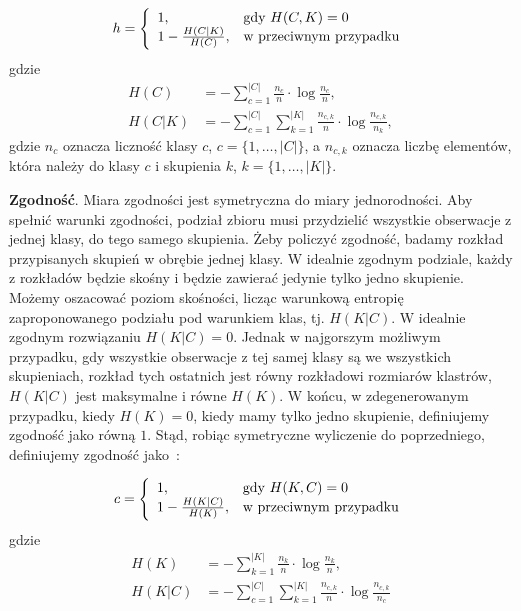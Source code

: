 \documentclass{praca1}
\begin{document}
\begin{equation}
h = \left\{
\begin{array}{l l}     
1, & \text{gdy } H(C,K) = 0\\
1 - \frac{H(C|K)}{H(C)}, & \text{w przeciwnym przypadku}
\end{array}\right.
\end{equation}
gdzie
\begin{align*}
H(C) & = - \sum\limits_{c = 1}^{|C|}\frac{n_c}{n}\cdot \log{\frac{n_c}{n}},  \\
H(C|K) & = - \sum\limits_{c = 1}^{|C|}\sum\limits_{k = 1}^{|K|}\frac{n_{c,k}}{n}\cdot \log{\frac{n_{c,k}}{n_k}},
\end{align*}
gdzie $n_c$ oznacza liczność klasy $c$, $c = \{1,\ldots, |C|\}$, a $n_{c,k}$ oznacza liczbę elementów, która należy do klasy $c$ i skupienia $k$, $k = \{1,\ldots, |K|\}$.

\textbf{Zgodność}. Miara zgodności jest symetryczna do miary jednorodności. Aby spełnić warunki zgodności, podział zbioru musi przydzielić wszystkie obserwacje z jednej klasy, do tego samego skupienia. Żeby policzyć zgodność, badamy rozkład przypisanych skupień w obrębie jednej klasy. W idealnie zgodnym podziale, każdy z rozkładów będzie skośny i będzie zawierać jedynie tylko jedno skupienie. Możemy oszacować poziom skośności, licząc warunkową entropię zaproponowanego podziału pod warunkiem klas, tj. $H(K|C)$. W idealnie zgodnym rozwiązaniu $H(K|C) = 0$. Jednak w najgorszym możliwym przypadku, gdy wszystkie obserwacje z tej samej klasy są we wszystkich skupieniach, rozkład tych ostatnich jest równy rozkładowi rozmiarów klastrów, $H(K|C)$ jest maksymalne i równe $H(K)$. W końcu, w zdegenerowanym przypadku, kiedy $H(K) = 0$, kiedy mamy tylko jedno skupienie, definiujemy zgodność jako równą $1$. Stąd, robiąc symetryczne wyliczenie do poprzedniego, definiujemy zgodność jako~\cite{Rosenberg2007:vmeasure}:

\begin{equation}
c = \left\{
\begin{array}{l l}     
1, & \text{gdy } H(K,C) = 0\\
1 - \frac{H(K|C)}{H(K)}, & \text{w przeciwnym przypadku}
\end{array}\right.
\end{equation}
gdzie
\begin{align*}
H(K) & = - \sum\limits_{k = 1}^{|K|}\frac{n_k}{n}\cdot \log{\frac{n_k}{n}},  \\
H(K|C) & = - \sum\limits_{c = 1}^{|C|}\sum\limits_{k = 1}^{|K|}\frac{n_{c,k}}{n}\cdot \log{\frac{n_{c,k}}{n_c}}
\end{align*}
\end{document}
